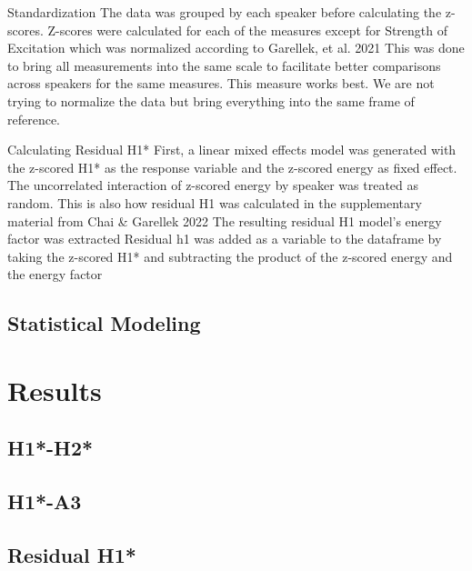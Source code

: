\documentclass[12pt, letterpaper]{article}
\begin{document}
Standardization
The data was grouped by each speaker before calculating the z-scores.
Z-scores were calculated for each of the measures except for Strength of Excitation which was normalized according to Garellek, et al. 2021
This was done to bring all measurements into the same scale to facilitate better comparisons across speakers for the same measures.
This measure works best. We are not trying to normalize the data but bring everything into the same frame of reference.

Calculating Residual H1*
First, a linear mixed effects model was generated with the z-scored H1* as the response variable and the z-scored energy as fixed effect. 
The uncorrelated interaction of z-scored energy by speaker was treated as random. 
This is also how residual H1 was calculated in the supplementary material from Chai \& Garellek 2022
The resulting residual H1 model’s energy factor was extracted
Residual h1 was added as a variable to the dataframe by taking the z-scored H1* and subtracting the product of the z-scored energy and the energy factor 


\subsection{Statistical Modeling} \label{sec:Statistics}





\section{Results} \label{sec:Results}


\subsection{H1*-H2*} \label{sec:H1H2}


\subsection{H1*-A3} \label{sec:H1A3}

\subsection{Residual H1*} \label{sec:ResidH1}
\end{document}
